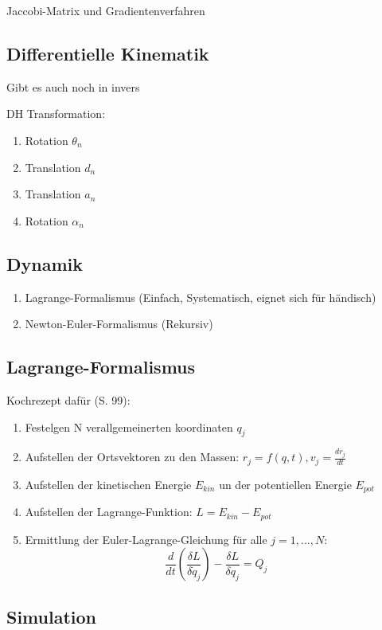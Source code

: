 \documentclass[a4paper]{article}
\begin{document}
Jaccobi-Matrix und Gradientenverfahren

\subsection{Differentielle Kinematik}

Gibt es auch noch in invers

DH Transformation:

\begin{enumerate}
    \item Rotation $\theta_n$
    \item Translation $d_n$
    \item Translation $a_n$
    \item Rotation $\alpha_n$
\end{enumerate}

\subsection{Dynamik}

\begin{enumerate}
    \item Lagrange-Formalismus (Einfach, Systematisch, eignet sich für händisch)
    \item Newton-Euler-Formalismus (Rekursiv)
\end{enumerate}

\subsection{Lagrange-Formalismus}

Kochrezept dafür (S. 99):

\begin{enumerate}
    \item Festelgen N verallgemeinerten koordinaten $q_j$
    \item Aufstellen der Ortsvektoren zu den Massen: $r_j = f(q, t), v_j = \frac{dr_j}{dt}$
    \item Aufstellen der kinetischen Energie $E_{kin}$ un der potentiellen Energie $E_{pot}$
    \item Aufstellen der Lagrange-Funktion: $L=E_{kin} - E_{pot}$
    \item Ermittlung der Euler-Lagrange-Gleichung für alle $j=1, ..., N$: $$\frac{d}{dt}\left(\frac{\delta L}{\delta \dot q_j}\right)-\frac{\delta L}{\delta q_j} = Q_j$$
\end{enumerate}

\subsection{Simulation}
\end{document}
